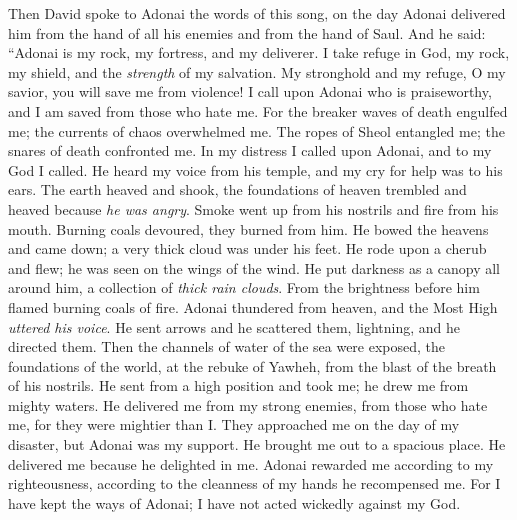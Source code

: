 \begin{biblechapter} %
 Then David spoke to Adonai the words of this song, on the day Adonai delivered him from the hand of all his enemies and from the hand of Saul.
\verse And he said: 
“Adonai is my rock, my fortress, and my deliverer.
\verse I take refuge in God, my rock, my shield, and the \textit{strength} of my salvation. 
My stronghold and my refuge, O my savior, you will save me from violence!
\verse I call upon Adonai who is praiseworthy, 
and I am saved from those who hate me.
\verse For the breaker waves of death engulfed me; 
the currents of chaos overwhelmed me.
\verse The ropes of Sheol entangled me; 
the snares of death confronted me.
\verse In my distress I called upon Adonai, and to my God I called. 
He heard my voice from his temple, 
and my cry for help was to his ears.
\verse The earth heaved and shook, 
the foundations of heaven trembled and heaved 
because \textit{he was angry}.
\verse Smoke went up from his nostrils and fire from his mouth. 
Burning coals devoured, they burned from him.
\verse He bowed the heavens and came down; 
a very thick cloud was under his feet.
\verse He rode upon a cherub and flew; 
he was seen on the wings of the wind.
\verse He put darkness as a canopy all around him, 
a collection of \textit{thick rain clouds}.
\verse From the brightness before him 
flamed burning coals of fire.
\verse Adonai thundered from heaven, 
and the Most High \textit{uttered his voice}.
\verse He sent arrows and he scattered them, 
lightning, and he directed them.
\verse Then the channels of water of the sea were exposed, 
the foundations of the world, 
at the rebuke of Yawheh, 
from the blast of the breath of his nostrils.
\verse He sent from a high position and took me; 
he drew me from mighty waters.
\verse He delivered me from my strong enemies, 
from those who hate me, for they were mightier than I.
\verse They approached me on the day of my disaster, 
but Adonai was my support.
\verse He brought me out to a spacious place. 
He delivered me because he delighted in me.
\verse Adonai rewarded me according to my righteousness, 
according to the cleanness of my hands he recompensed me.
\verse For I have kept the ways of Adonai; 
I have not acted wickedly against my God.

\end{biblechapter}
